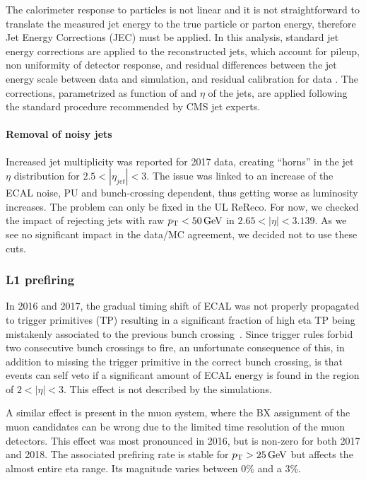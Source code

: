 The calorimeter response to particles is not linear and it is not straightforward to translate the measured jet energy
to the true particle or parton energy, therefore Jet Energy Corrections (JEC) must be applied.
In this analysis, standard jet energy corrections are applied to the reconstructed jets, which account for pileup,
non uniformity of detector response, and residual differences between the jet energy scale between data and simulation, and residual calibration for data
\cite{CMS:JEC_2011, CMS-DP-2016-020, CMS-DP-2021-033}.
The corrections, parametrized as function of \pt and $\eta$ of the jets, are applied following the standard procedure recommended by CMS jet experts.

\paragraph{Removal of noisy jets\\}
Increased jet multiplicity was reported for 2017 data, creating ``horns'' in the jet $\eta$ distribution for $2.5<|\eta_{jet}|<3$.
The issue was linked to an increase of the ECAL noise, PU and bunch-crossing dependent, thus getting worse as luminosity increases.
The problem can only be fixed in the UL ReReco.
For now, we checked the impact of rejecting jets with raw $p_{\mathrm{T}} < 50 \,\text{Ge\hspace{-.08em}V}$ in $2.65 <|\eta| < 3.139$.
As we see no significant impact in the data/MC agreement, we decided not to use these cuts.

\subsubsection{L1 prefiring}

In 2016 and 2017, the gradual timing shift of ECAL was not properly propagated to \Lone trigger primitives (TP)
resulting in a significant fraction of high eta TP being mistakenly associated to the previous bunch crossing~\cite{CMS:L1trigger_Run2}.
Since \Lone trigger rules forbid two consecutive bunch crossings to fire, an unfortunate consequence of this,
in addition to missing the trigger primitive in the correct bunch crossing,
is that events can self veto if a significant amount of ECAL energy is found in the region of $2<|\eta|<3$.
This effect is not described by the simulations.

A similar effect is present in the muon system, where the BX assignment of the muon candidates can be wrong due to the limited time resolution of the muon detectors.
This effect was most pronounced in 2016, but is non-zero for both 2017 and 2018.
The associated prefiring rate is stable for $p_{\mathrm{T}} > 25 \,\text{Ge\hspace{-.08em}V}$ but affects the almost entire eta range.
Its magnitude varies between 0\% and a 3\%.

